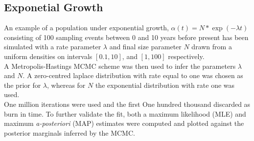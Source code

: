 \documentclass{report}
\theoremstyle{definition}
\begin{document}
\subsection{Exponetial Growth}
An example of a population under exponential growth, $\alpha(t) = N*\exp(-\lambda t)$ consisting of 100 sampling events between 0 and 10 years before present has been simulated with a rate parameter $\lambda$ and final size parameter $N$ drawn from a uniform densities on intervals $[0.1, 10]$, and $[1,100]$ respectively.\\
A Metropolis-Hastings MCMC scheme was then used to infer the parameters $\lambda$ and $N$. A zero-centred laplace distribution with rate equal to one was chosen as the prior for $\lambda$, whereas for $N$ the exponential distribution with rate one was used.\\
One million iterations were used and the first One hundred thousand discarded as burn in time. To further validate the fit, both a maximum likelihood (MLE) and maximum \textit{a-posteriori} (MAP) estimates were computed and plotted against the posterior marginals inferred by the MCMC.
\end{document}
